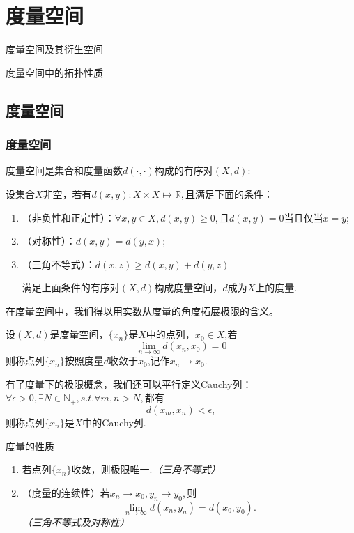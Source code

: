 \documentclass[lang=cn,10pt]{elegantbook}
\begin{document}
	\chapter{度量空间}
	\begin{introduction}
		\item 度量空间及其衍生空间
		\item 度量空间中的拓扑性质
	\end{introduction}
	
	\section{度量空间}
	
	\subsection{度量空间}
	度量空间是集合和度量函数\(d(\cdot,\cdot)\)构成的有序对\((X,d)\):
	\begin{definition}[度量空间]
		设集合\(X\)非空，若有\(d(x,y):X\times X \longmapsto \mathbb{R},\)且满足下面的条件：
		\begin{enumerate}
			\item （非负性和正定性）：\(\forall x,y \in X,d(x,y)\ge0,\)且\(d(x,y)=0\)当且仅当\(x=y\);
			\item （对称性）：\(d(x,y)=d(y,x);\)
			\item （三角不等式）：\(d(x,z)\ge d(x,y)+d(y,z)\)
			
			满足上面条件的有序对\((X,d)\)构成度量空间，\(d\)成为\(X\)上的度量.
		\end{enumerate}
	\end{definition}
	在度量空间中，我们得以用实数从度量的角度拓展极限的含义。
	\begin{definition}[度量空间中的极限]
		设\((X,d)\)是度量空间，\(\{x_n\}\)是\(X\)中的点列，\(x_0 \in X\),若
		\[\lim_{n\to \infty}d(x_n,x_0)=0\]
		则称点列\(\{x_n\}\)按照度量\(d\)收敛于\(x_0\),记作\(x_n \to x_0\).
		
		有了度量下的极限概念，我们还可以平行定义Cauchy列：\(\forall \epsilon>0,\exists N\in \mathbb{N}_+,s.t.\forall m,n>N,\)都有
		\[d(x_m,x_n)<\epsilon,\]
		则称点列\(\{x_n\}\)是\(X\)中的Cauchy列.
	\end{definition}
	\begin{property}
		度量的性质
		\begin{enumerate}
			\item 若点列\(\{x_n\}\)收敛，则极限唯一.\textit{（三角不等式）}
			\item （度量的连续性）若\(x_n \to x_0,y_n\to y_0,\)则
			\[\lim_{n\to \infty}d(x_n,y_n)=d(x_0,y_0).\]
			\textit{（三角不等式及对称性）}
		\end{enumerate}
	\end{property}
\end{document}
